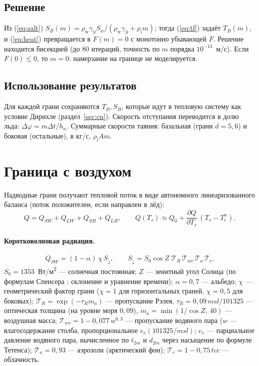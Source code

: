 \documentclass[12pt,a4paper]{article}
\newcommand{\rhoi}{\rho_{\mathrm i}}
\newcommand{\rhow}{\rho_{\mathrm w}}
\begin{document}
\subsection{Решение}
Из (\ref{eq:salt}) $S_B(m)=\rhow\gamma_S S_w/(\rhow\gamma_S+\rhoi m)$; тогда (\ref{eq:tf}) задаёт $T_B(m)$, и (\ref{eq:heat}) превращается в $F(m)=0$ с монотонно убывающей $F$. Решение находится бисекцией (до 80 итераций, точность по $m$ порядка $10^{-13}$~м/с). Если $F(0)\le0$, то $m=0$: намерзание на границе не моделируется.

\subsection{Использование результатов}
Для каждой грани сохраняются $T_B,S_B$, которые идут в тепловую систему как условие Дирихле (раздел~\ref{sec:cn}). Скорость отступания переводится в долю льда: $\Delta\varphi=m\Delta t/h_n$. Суммарные скорости таяния: базальная (грани $d=5,6$) и боковая (остальные), в кг/с, $\rhoi A m$.

\section{Граница с воздухом}\label{sec:air}

Надводные грани получают тепловой поток в виде автономного линеаризованного баланса (поток положителен, если направлен в лёд):
\begin{equation}
Q=Q_{SW}+Q_{LW}+Q_{SH}+Q_{LH},\qquad Q(T_s)\approx Q_0+\frac{\partial Q}{\partial T_s}\,(T_s-T_i^n).
\end{equation}

\paragraph{Коротковолновая радиация.}
\begin{equation}
Q_{SW}=(1-\alpha)\,\chi\,S_\downarrow,\qquad
S_\downarrow=S_0\cos Z\;\mathcal T_R\,\mathcal T_{wv}\,\mathcal T_a\,\mathcal T_c .
\end{equation}
$S_0=1353$~Вт/м\textsuperscript2 --- солнечная постоянная; $Z$ --- зенитный угол Солнца (по формулам Спенсера \cite{spencer1971}: склонение и уравнение времени); $\alpha=0{,}7$ --- альбедо; $\chi$ --- геометрический фактор грани ($\chi=1$ для горизонтальных граней, $\chi=0{,}5$ для боковых); $\mathcal T_R=\exp(-\tau_R m_a)$ --- пропускание Рэлея, $\tau_R=0{,}09\,msl/101325$ --- оптическая толщина (на уровне моря $0{,}09$), $m_a=\min(1/\cos Z,\,40)$ --- воздушная масса; $\mathcal T_{wv}=1-0{,}077\,w^{0{,}3}$ --- пропускание водяного пара ($w$ --- влагосодержание столба, пропорциональное $e_{v}(101325/msl)$; $e_v$ --- парциальное давление водяного пара, вычисленное по $t_{2m}$ и $d_{2m}$ через насыщение по формуле Тетенса); $\mathcal T_a=0{,}93$ --- аэрозоли (арктический фон); $\mathcal T_c=1-0{,}75\,tcc$ --- облачность.
\end{document}
